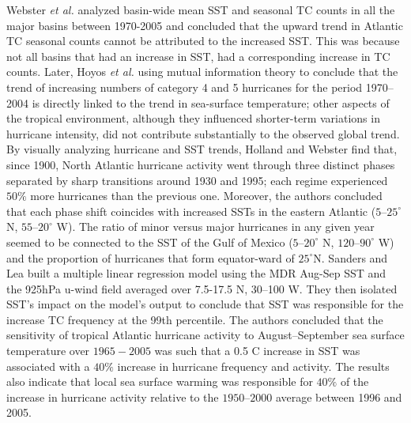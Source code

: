 \documentclass[a4paper,10pt]{article}
\begin{document}
Webster \textit{et al.} \cite{webster2005} analyzed basin-wide mean SST and seasonal TC counts in all the major basins between 1970-2005 and concluded that the upward trend in Atlantic TC seasonal counts cannot be attributed to the increased SST. This was because not all basins that had an increase in SST, had a corresponding increase in TC counts. Later, Hoyos \textit{et al.} \cite{hoyos2006} using mutual information theory to conclude that the trend of increasing numbers of category 4 and 5 hurricanes for the period 1970–2004 is directly linked to the trend in sea-surface temperature; other aspects of the tropical environment, although they influenced shorter-term variations in hurricane intensity, did not contribute substantially to the observed global trend.
By visually analyzing hurricane and SST trends, Holland and Webster \cite{holland2007} find that, since 1900, North Atlantic hurricane activity went through three distinct phases separated by sharp transitions around 1930 and 1995; each regime experienced $50\%$ more hurricanes than the previous one. Moreover, the authors concluded that each phase shift coincides with increased SSTs in the eastern Atlantic ($5–25^\circ$ N, $55–20^\circ$ W). The ratio of minor versus major hurricanes in any given year seemed to be connected to the SST of the Gulf of Mexico ($5–20^\circ$ N, $120–90^\circ$ W) and the proportion of hurricanes that form equator-ward of $25^\circ$N. 
Sanders and Lea \cite{saunders2008} built a multiple linear regression model using the MDR Aug-Sep SST and the 925hPa u-wind field averaged over 7.5-17.5 N, 30–100 W. They then isolated SST's impact on the model's output to conclude that SST was responsible for the increase TC frequency at the 99th percentile. The authors concluded that the sensitivity of tropical Atlantic hurricane activity to August–September sea surface temperature over $1965-2005$ was such that a 0.5 C increase in SST was associated with a $40\%$ increase in hurricane frequency and activity. The results also indicate that local sea surface warming was responsible for $40\%$ of the increase in hurricane activity relative to the $1950–2000$ average between 1996 and 2005.
\end{document}
